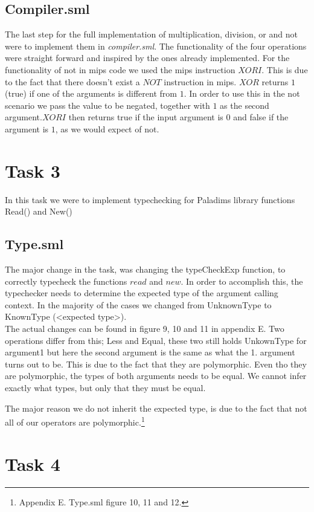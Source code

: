 \documentclass[12pt,a4paper,english]{article}
\begin{document}
\subsection{Compiler.sml}
The last step for the full implementation of multiplication, division, or and not were to implement them in \textit{compiler.sml}. The functionality of the four operations were straight forward and inspired by the ones already implemented. For the functionality of not in mips code we used the mips instruction $XORI$. This is due to the fact that there doesn't exist a $NOT$ instruction in mips. $XOR$ returns $1$ (true) if one of the arguments is different from $1$. In order to use this in the not scenario we pass the value to be negated, together with $1$ as the second argument.$XORI$ then returns true if the input argument is $0$ and false if the argument is $1$, as we would expect of not. 

\section{Task 3}
In this task we were to implement typechecking for Paladims library functions Read() and New()
\subsection{Type.sml}
The major change in the task, was changing the typeCheckExp function, to correctly typecheck the functions $read$ and $new$. In order to accomplish this, the typechecker needs to determine the expected type of the argument calling context. In the majority of the cases we changed from UnknownType to KnownType (<expected type>). \\

The actual changes can be found in figure 9, 10 and 11 in appendix E. Two operations differ from this; Less and Equal, these two still holds UnkownType for argument1 but here the second argument is the same as what the 1. argument turns out to be. This is due to the fact that they are polymorphic. Even tho they are polymorphic, the types of both arguments needs to be equal. We cannot infer exactly what types, but only that they must be equal.

The major reason we do not inherit the expected type, is due to the fact that not all of our operators are polymorphic.\footnote{Appendix E. Type.sml figure 10, 11 and 12.}

\section{Task 4}
\end{document}
